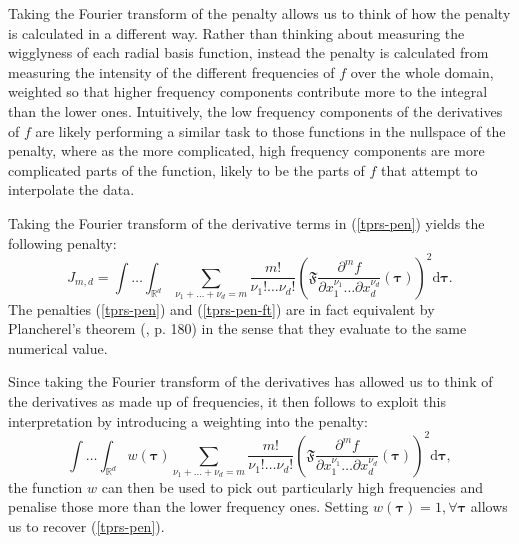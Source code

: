 Taking the Fourier transform of the penalty allows us to think of how the penalty is calculated in a different way. Rather than thinking about measuring the wigglyness of each radial basis function, instead the penalty is calculated from measuring the intensity of the different frequencies of $f$ over the whole domain, weighted so that higher frequency components contribute more to the integral than the lower ones. Intuitively, the low frequency components of the derivatives of $f$ are likely performing a similar task to those functions in the nullspace of the penalty, where as the more complicated, high frequency components are more complicated parts of the function, likely to be the parts of $f$ that attempt to interpolate the data.

Taking the Fourier transform of the derivative terms in (\ref{tprs-pen}) yields the following penalty:
\begin{equation}
J_{m,d} = \int \ldots \int_{\mathbb{R}^d} \sum_{\nu_1 + \dots + \nu_d=m} \frac{m!}{\nu_1! \dots \nu_d!} \left ( \mathfrak{F} \frac{\partial^m f}{\partial x_1^{\nu_1} \ldots  \partial x_d^{\nu_d}} \left (  \boldsymbol{\tau}\right ) \right )^2 \text{d} \boldsymbol{\tau}.
\label{tprs-pen-ft}
\end{equation}
The penalties (\ref{tprs-pen}) and (\ref{tprs-pen-ft}) are in fact equivalent by Plancherel's theorem (\cite{vretblad}, p. 180) in the sense that they evaluate to the same numerical value.

Since taking the Fourier transform of the derivatives has allowed us to think of the derivatives as made up of frequencies, it then follows to exploit this interpretation by introducing a weighting into the penalty: 
\begin{equation}
\int \ldots \int_{\mathbb{R}^d} w(\boldsymbol{\tau}) \sum_{\nu_1 + \dots + \nu_d=m} \frac{m!}{\nu_1! \dots \nu_d!} \left ( \mathfrak{F} \frac{\partial^m f}{\partial x_1^{\nu_1} \ldots  \partial x_d^{\nu_d}} \left (\boldsymbol{\tau} \right ) \right )^2 \text{d} \boldsymbol{\tau},
\label{duchon-penalty-general}
\end{equation}
the function $w$ can then be used to pick out particularly high frequencies and penalise those more than the lower frequency ones. Setting $w(\boldsymbol{\tau})=1, \forall \boldsymbol{\tau}$ allows us to recover (\ref{tprs-pen}).

